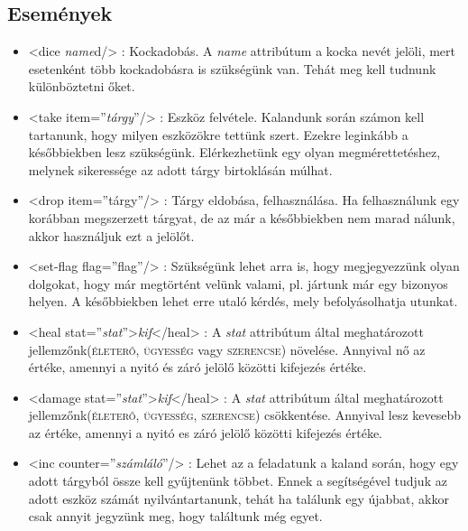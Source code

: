 \documentclass[12pt,a4paper,oneside]{report}
\newcommand{\xtag}[1]{{\color{Tag}#1}}
\newcommand{\xattr}[2]{{\color{Attr}#1}={\color{Value}''#2''}}
\newcommand{\stat}{\textsc}
\newcommand{\attr}{\emph}
\newcommand{\kif}{\emph{kif}}
\begin{document}
    \subsection{Események}
      \begin{itemize}
        \item <\xtag{dice} \attr{name}{d}/>
          : Kockadobás. A \attr{name} attribútum a kocka nevét jelöli,
          mert esetenként több kockadobásra is szükségünk van. Tehát
          meg kell tudnunk különböztetni őket.
    
        \item <\xtag{take} \xattr{item}{\emph{tárgy}}/>          
          : Eszköz felvétele. Kalandunk során számon kell tartanunk,
          hogy milyen eszközökre tettünk szert. Ezekre leginkább a
          későbbiekben lesz szükségünk. Elérkezhetünk egy olyan
          megmérettetéshez, melynek sikeressége az adott tárgy
          birtoklásán múlhat.
    
        \item <\xtag{drop} \xattr{item}{tárgy}/>          
          : Tárgy eldobása, felhasználása. Ha felhasználunk egy
          korábban megszerzett tárgyat, de az már a későbbiekben nem
          marad nálunk, akkor használjuk ezt a jelölőt.
    
        \item <\xtag{set-flag} \xattr{flag}{flag}/>
          : Szükségünk lehet arra is, hogy megjegyezzünk olyan
          dolgokat, hogy már megtörtént velünk valami, pl. jártunk már
          egy bizonyos helyen. A későbbiekben lehet erre utaló kérdés,
          mely befolyásolhatja utunkat.
          
        \item <\xtag{heal} \xattr{stat}{\emph{stat}}>\kif<\xtag{/heal}>
          : A \emph{stat} attribútum által meghatározott
          jellemzőnk(\stat{életerő}, \stat{ügyesség} vagy \stat{szerencse})
          növelése. Annyival nő az értéke, amennyi a nyitó és záró
          jelölő közötti kifejezés értéke.
          
        \item <\xtag{damage} \xattr{stat}{\emph{stat}}>\kif<\xtag{/heal}>
          : A \emph{stat} attribútum által meghatározott
          jellemzőnk(\stat{életerő}, \stat{ügyesség}, \stat{szerencse})
          csökkentése. Annyival lesz kevesebb az értéke, amennyi a nyitó
          es záró jelölő közötti kifejezés értéke.
    
        \item <\xtag{inc} \xattr{counter}{\emph{számláló}}/> 
          : Lehet az a feladatunk a kaland során, hogy egy adott
          tárgyból össze kell gyűjtenünk többet. Ennek a segítségével
          tudjuk az adott eszköz számát nyilvántartanunk, tehát ha
          találunk egy újabbat, akkor csak annyit jegyzünk meg, hogy
          találtunk még egyet.
          

\end{itemize}
\end{document}
